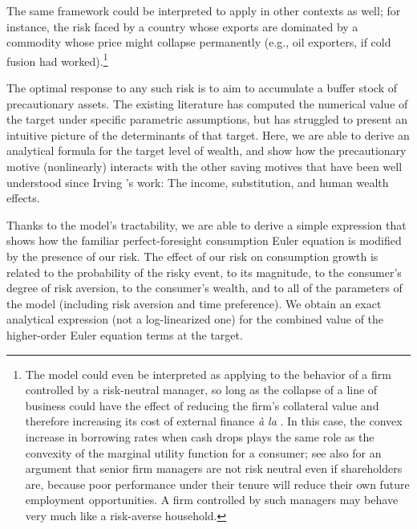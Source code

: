 \documentclass[titlepage,abstract]{\econtex}\newcommand{\texname}{ctDiscrete}
\begin{document}
The same framework could be interpreted to apply in other contexts as well; for instance,
the risk faced by a country whose exports are dominated by a commodity
whose price might collapse permanently (e.g., oil exporters, if cold
fusion had worked).\footnote{ The model could even be interpreted as
  applying to the behavior of a firm controlled by a risk-neutral
  manager, so long as the collapse of a line of business could have
  the effect of reducing the firm's collateral value and therefore
  increasing its cost of external finance \textit{\`{a} la}
  \cite{bernanke&gertler&gilchrist:accellerator}. In this case, the
  convex increase in borrowing rates when cash drops plays the same
  role as the convexity of the marginal utility function for a
  consumer; see also \cite{bszHumK} for an argument that senior firm
  managers are not risk neutral even if shareholders are, because poor
  performance under their tenure will reduce their own future
  employment opportunities.  A firm controlled by such managers may
  behave very much like a risk-averse household.}

The optimal response to any such risk is to aim to accumulate a buffer
stock of precautionary assets.  The existing literature has computed the
numerical value of the target under specific parametric assumptions,
but has struggled to present an intuitive picture of the determinants
of that target.  Here, we are able to derive an analytical
formula for the target level of wealth, and show how the
precautionary motive (nonlinearly) interacts with the other saving motives that have
been well understood since Irving \cite{fisherInterestTheory}'s work:
The income, substitution, and human wealth effects.

Thanks to the model's tractability, we are able to derive a simple
expression that shows how the familiar perfect-foresight consumption
Euler equation is modified by the presence of our risk.  The effect of our risk on consumption growth
is related to the probability of the risky event, to its magnitude, to
the consumer's degree of risk aversion, to the consumer's wealth, and
to all of the parameters of the model (including risk aversion and
time preference). We obtain an exact analytical expression (not a
log-linearized one) for the combined value of the higher-order Euler equation terms
at the target.
\end{document}

